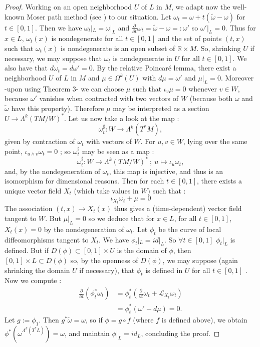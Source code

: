 \documentclass[a4paper,12pt,leqno]{article}
\begin{document}
\begin{proof}
Working on an open neighborhood $U$ of $L$ in $M$, we adapt now the well-known Moser path method (see \cite{mosvol}) to our situation. Let $\omega_t=\omega +t(\widetilde{\omega}-\omega)$ for $t\in [0,1]$. Then we have $\omega_t|_L=\omega|_L$ and $\frac{\partial}{\partial t}\omega_t=\widetilde{\omega}-\omega=:\omega'$ so $\omega'|_L=0$. Thus for $x\in L$, $\omega_t(x)$ is nondegenerate for all $t\in [0,1]$ and the set of points $(t,x)$ such that $\omega_t(x)$ is nondegenerate is an open subset of $\mathbb{R}\times M$. So, shrinking $U$ if necessary, we may suppose that $\omega_t$ is nondegenerate in $U$ for all $t\in [0,1]$. We also have that $d\omega_t=d\omega'=0$. By the relative Poincar\'e lemma, there exist a neighborhood $U$ of $L$ in $M$ and $\mu\in\Omega^k(U)$ with $d\mu=\omega'$ and $\mu|_L=0$. Moreover 
-upon using Theorem 3- we can choose $\mu$ such that $\iota_v\mu=0$ whenever $v\in W$, because $\omega'$ vanishes when contracted with two vectors of $W$ (because both $\omega$ and $\widetilde{\omega}$ have this property). Therefore $\mu$ may be interpreted as a section $U\rightarrow \Lambda^k(TM/W)^*$. Let us now take a look at the map :
\begin{equation*}
\omega_t^{\sharp}:W\rightarrow \Lambda^k(T^*M),
\end{equation*}
given by contraction of $\omega_t$ with vectors of $W$. For $u,v\in W$, lying over the same point, $\iota_{u\wedge v}\omega_t=0$ ; so $\omega_t^{\sharp}$ may be seen as a map :
\begin{equation*}
\omega_t^{\sharp}:W\rightarrow \Lambda^k(TM/W)^* \ ; \ u\mapsto \iota_u\omega_t,
\end{equation*}
and, by the nondegeneration of $\omega_t$, this map is injective, and thus is an isomorphism for dimensional reasons. Then for each $t\in [0,1]$, there exists a unique vector field $X_t$ (which take values in $W$) such that :
\begin{equation*}
\iota_{X_t}\omega_t +\mu=0
\end{equation*}
The association $(t,x)\rightarrow X_t(x)$ thus gives a (time-dependent) vector field tangent to $W$. But $\mu|_L=0$ so we deduce that for $x\in L$, for all $t\in [0,1]$, $X_t(x)=0$ by the nondegeneration of $\omega_t$. Let $\phi_t$ be the curve of local diffeomorphisms tangent to $X_t$. We have $\phi_t|_L=id|_L$.  So $\forall t\in [0,1]$ $\phi_t|_L$ is defined. But if $D(\phi)\subset [0,1]\times U$ is the domain of $\phi$, then $[0,1]\times L\subset D(\phi)$ so, by the openness of $D(\phi)$, we may suppose (again shrinking the domain $U$ if necessary), that $\phi_t$ is defined in $U$ for all $t\in[0,1]$ . Now we compute :
\begin{align*}
\frac{\partial}{\partial t} \left(\phi_t^*\omega_t\right) &=
\phi_t^*\left(\frac{\partial}{\partial t}\omega_t +\mathcal{L}_{X_t}\omega_t\right) \\
&=\phi_t^*(\omega'-d\mu)=0.
\end{align*}
Let $g:=\phi_1$. Then $g^*\widetilde{\omega}=\omega$, so if $\phi=g\circ f$ (where $f$ is defined above), we obtain $\phi^*(\omega^{\Lambda^k(T^*L)})=\omega$, and maintain $\phi|_L=id_L$, concluding the proof. 
\end{proof}
\end{document}
